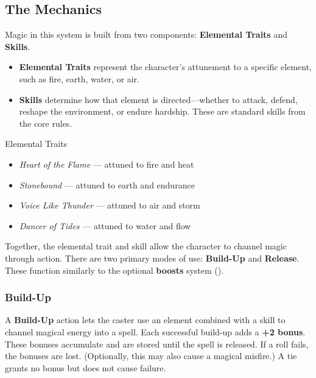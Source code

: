 \subsection{The Mechanics}

Magic in this system is built from two components: \textbf{Elemental Traits} and \textbf{Skills}.

\begin{itemize}\raggedright
    \item \textbf{Elemental Traits} represent the character’s attunement to a specific element, such as fire, earth, water, or air.
    \item \textbf{Skills} determine how that element is directed—whether to attack, defend, reshape the environment, or endure hardship. These are standard skills from the core rules.
\end{itemize}

\begin{Example}{Elemental Traits}
    \begin{itemize}
        \item \textit{Heart of the Flame} — attuned to fire and heat  
        \item \textit{Stonebound} — attuned to earth and endurance  
        \item \textit{Voice Like Thunder} — attuned to air and storm  
        \item \textit{Dancer of Tides} — attuned to water and flow  
    \end{itemize}
\end{Example}

Together, the elemental trait and skill allow the character to channel magic through action. There are two primary modes of use: \textbf{Build-Up} and \textbf{Release}. These function similarly to the optional \textbf{boosts} system ().

\subsubsection{Build-Up}

A \textbf{Build-Up} action lets the caster use an element combined with a skill to channel magical energy into a spell. Each successful build-up adds a \textbf{+2 bonus}. These bonuses accumulate and are stored until the spell is released. If a roll fails, the bonuses are lost. (Optionally, this may also cause a magical misfire.) A tie grants no bonus but does not cause failure.

